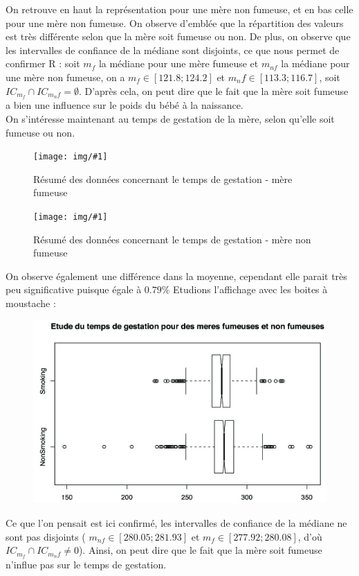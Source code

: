 \documentclass[a4paper,11pt]{article}
\newcommand{\InsertFigTitle}[2]{
\begin{figure}[H]
\caption{#2}
\begin{center}
\texttt{[image: img/\#1]}
\end{center}
\end{figure}}
\begin{document}
\noindent On retrouve en haut la représentation pour une mère non fumeuse, et en bas celle pour une mère non fumeuse. On observe d'emblée que la répartition des valeurs est très différente selon que la mère soit fumeuse ou non. De plus, on observe que les intervalles de confiance de la médiane sont disjoints, ce que nous permet de confirmer R : soit $m_f$ la médiane pour une mère fumeuse et $m_{nf}$ la médiane pour une mère non fumeuse, on a $m_f \in [121.8;124.2]$ et ${m_nf} \in [113.3;116.7]$, soit $IC_{m_f} \cap IC_{ m_nf} = \emptyset$. D'après cela, on peut dire que le fait que la mère soit fumeuse a bien une influence sur le poids du bébé à la naissance. \\

\noindent On s'intéresse maintenant au temps de gestation de la mère, selon qu'elle soit fumeuse ou non.  

\InsertFigTitle{gestationmerefumeuse}{Résumé des données concernant le temps de gestation - mère fumeuse}

\InsertFigTitle{gestationmerenonfumeuse}{Résumé des données concernant le temps de gestation - mère non fumeuse}

\noindent On observe également une différence dans la moyenne, cependant elle parait très peu significative puisque égale à $0.79\%$ Etudions l'affichage avec les boites à moustache : 

\begin{figure}[H]
\begin{center}
\includegraphics[width=.6\textwidth]{img/tempsgestation}
\end{center}
\end{figure}

\noindent Ce que l'on pensait est ici confirmé, les intervalles de confiance de la médiane ne sont pas disjoints ( $m_{nf} \in [280.05;281.93]$ et $m_f \in [277.92;280.08]$, d'où $IC_{m_f} \cap IC_{ m_nf} \ne0$). Ainsi, on peut dire que le fait que la mère soit fumeuse n'influe pas sur le temps de gestation. \\
\end{document}
